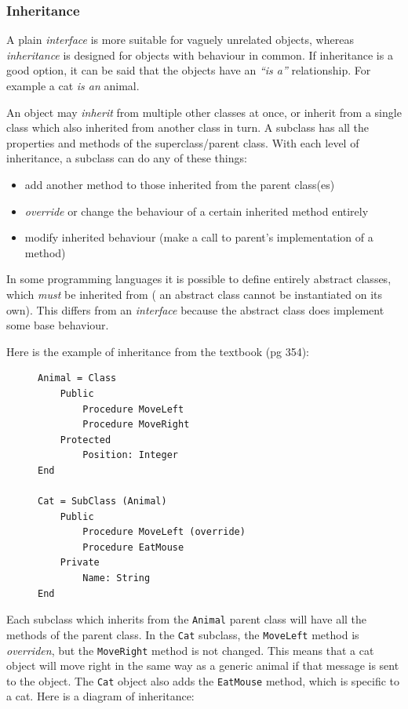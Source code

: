 \documentclass[10pt]{article}
\begin{document}
\subsubsection{Inheritance}
\label{sec:org07eacb1}

A plain \emph{interface} is more suitable for vaguely unrelated objects, whereas \emph{inheritance} is designed for objects with behaviour in common. If inheritance is a good option, it can be said that the objects have an \emph{``is a''} relationship. For example a cat \emph{is an} animal.

An object may \emph{inherit} from multiple other classes at once, or inherit from a single class which also inherited from another class in turn. A subclass has all the properties and methods of the superclass/parent class. With each level of inheritance, a subclass can do any of these things:

\begin{itemize}
\item add another method to those inherited from the parent class(es)
\item \emph{override} or change the behaviour of a certain inherited method entirely
\item modify inherited behaviour (make a call to parent's implementation of a method)
\end{itemize}

In some programming languages it is possible to define entirely abstract classes, which \emph{must} be inherited from ( an abstract class cannot be instantiated on its own). This differs from an \emph{interface} because the abstract class does implement some base behaviour.

Here is the example of inheritance from the textbook (pg 354):

\begin{figure}[H]
\begin{verbatim}
Animal = Class
    Public
        Procedure MoveLeft
        Procedure MoveRight
    Protected
        Position: Integer
End

Cat = SubClass (Animal)
    Public
        Procedure MoveLeft (override)
        Procedure EatMouse
    Private
        Name: String
End
\end{verbatim}
\end{figure}


Each subclass which inherits from the \texttt{Animal} parent class will have all the methods of the parent class. In the \texttt{Cat} subclass, the \texttt{MoveLeft} method is \emph{overriden}, but the \texttt{MoveRight} method is not changed. This means that a cat object will move right in the same way as a generic animal if that message is sent to the object. The \texttt{Cat} object also adds the \texttt{EatMouse} method, which is specific to a cat. Here is a diagram of inheritance:
\end{document}
